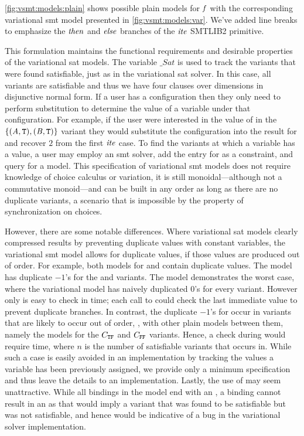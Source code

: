 \autoref{fig:vsmt:models:plain} shows possible plain models for $\mathit{f}$ with
the corresponding variational \ac{smt} model presented in
\autoref{fig:vsmt:models:var}. We've added line breaks to emphasize the
$\mathit{then}$ and $\mathit{else}$ branches of the $\mathit{ite}$ SMTLIB2 primitive.

This formulation maintains the functional requirements and desirable properties
of the variational \ac{sat} models. The variable $\_Sat$ is used to track the
variants that were found satisfiable, just as in the variational \ac{sat}
solver. In this case, all variants are satisfiable and thus we have four clauses
over dimensions in disjunctive normal form. If a user has a configuration then
they only need to perform substitution to determine the value of a variable
under that configuration. For example, if the user were interested in the value
of \iV{} in the $\{(\mathit{A}{}, \texttt{T}{}), (\mathit{B}{}, \texttt{T}{})\}$ variant they would
substitute the configuration into the result for \iV{} and recover $2$ from the
first $\mathit{ite}$ case. To find the variants at which a variable has a value, a
user may employ an \ac{smt} solver, add the entry for \iV{} as a constraint, and
query for a model.
%
This specification of variational \ac{smt} models does not require knowledge of
choice calculus or variation, it is still monoidal---although not a commutative
monoid---and can be built in any order as long as there are no duplicate
variants, a scenario that is impossible by the property of synchronization on
choices.


However, there are some notable differences. Where variational \ac{sat} models
clearly compressed results by preventing duplicate values with constant
variables, the variational \ac{smt} model allows for duplicate values, if those
values are produced out of order. For example, both models for \iV{} and \cV{}
contain duplicate values. The \iV{} model has duplicate $-1$'s for the
\set{(\AV{}, \tru{}), (\BV{}, \tru{})} and \set{(\AV{}, \fls{}), (\BV{},
  \fls{})} variants. The \cV{} model demonstrates the worst case, where the
variational model has naively duplicated $0$'s for every variant. However only
\cV{} is easy to check in  time; each call to  could check
the last immediate value to prevent duplicate branches. In contrast, the
duplicate $-1$'s for \iV{} occur in variants that are likely to occur out of
order, \ie{}, with other plain models between them, namely the models for the
$C_{\texttt{T}\texttt{F}}$ and $C_{\texttt{F}\texttt{F}}$ variants. Hence, a check during 
would require  time, where $n$ is the number of satisfiable variants
that \iV{} occurs in. While such a case is easily avoided in an implementation
by tracking the values a variable has been previously assigned, we provide only
a minimum specification and thus leave the details to an implementation.
%
Lastly, the use of \undefined{} may seem unattractive. While all bindings in the
model end with an \undefined{}, a binding cannot result in an \undefined{} as
that would imply a variant that was found to be satisfiable but was not
satisfiable, and hence would be indicative of a bug in the variational solver
implementation.

